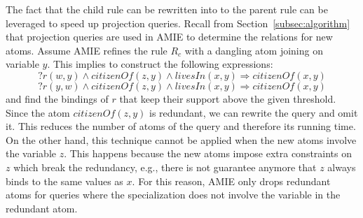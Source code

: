 {%
%
The fact that the child rule can be rewritten into to the parent rule can be leveraged to speed up projection queries.
Recall from Section~\ref{subsec:algorithm} that projection queries are used in AMIE to determine the
relations for new atoms. Assume AMIE refines the rule $R_c$ with a dangling atom
joining on variable $y$. This implies to construct the following expressions:
\[
?r(w,y) \wedge \textit{citizenOf}(z,y)\wedge \textit{livesIn}(x,y)\Rightarrow \textit{citizenOf}(x,y)
\]
\[
?r(y,w) \wedge \textit{citizenOf}(z,y)\wedge \textit{livesIn}(x,y)\Rightarrow \textit{citizenOf}(x,y)
\]
\noindent and find the bindings of $r$ that keep their support above the given threshold.
Since the atom $citizenOf(z,y)$ is redundant, we can rewrite the query and omit it.
This reduces the number of atoms of the query and therefore its running time.
On the other hand, this technique cannot be applied when the new atoms involve the variable $z$. This happens
because the new atoms impose extra constraints on $z$ which break the redundancy, e.g.,
there is not guarantee anymore that $z$ always binds to the same values as $x$. For this reason, AMIE only
drops redundant atoms for queries where the specialization does not involve the variable in the redundant atom.





}
